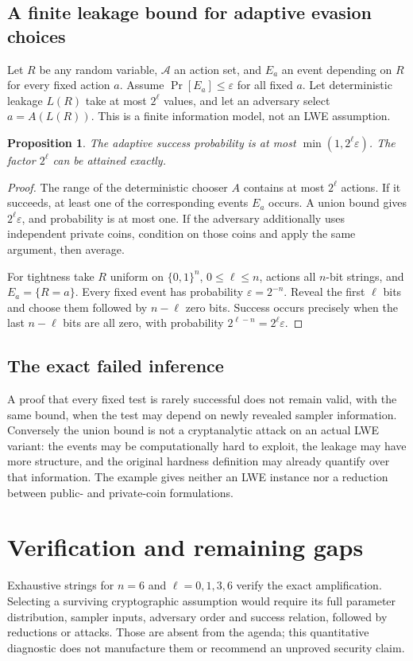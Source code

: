 \documentclass[11pt]{article}
\newtheorem{proposition}{Proposition}
\begin{document}
\subsection{A finite leakage bound for adaptive evasion choices}
Let $R$ be any random variable, $\mathcal A$ an action set, and $E_a$ an event depending on $R$ for every fixed action $a$. Assume $\Pr[E_a]\le\varepsilon$ for all fixed $a$. Let deterministic leakage $L(R)$ take at most $2^\ell$ values, and let an adversary select $a=A(L(R))$. This is a finite information model, not an LWE assumption.
\begin{proposition}
The adaptive success probability is at most $\min(1,2^\ell\varepsilon)$. The factor $2^\ell$ can be attained exactly.
\end{proposition}
\begin{proof}
The range of the deterministic chooser $A$ contains at most $2^\ell$ actions. If it succeeds, at least one of the corresponding events $E_a$ occurs. A union bound gives $2^\ell\varepsilon$, and probability is at most one. If the adversary additionally uses independent private coins, condition on those coins and apply the same argument, then average.

For tightness take $R$ uniform on $\{0,1\}^n$, $0\le\ell\le n$, actions all $n$-bit strings, and $E_a=\{R=a\}$. Every fixed event has probability $\varepsilon=2^{-n}$. Reveal the first $\ell$ bits and choose them followed by $n-\ell$ zero bits. Success occurs precisely when the last $n-\ell$ bits are all zero, with probability $2^{\ell-n}=2^\ell\varepsilon$.
\end{proof}
\subsection{The exact failed inference}
A proof that every fixed test is rarely successful does not remain valid, with the same bound, when the test may depend on newly revealed sampler information. Conversely the union bound is not a cryptanalytic attack on an actual LWE variant: the events may be computationally hard to exploit, the leakage may have more structure, and the original hardness definition may already quantify over that information. The example gives neither an LWE instance nor a reduction between public- and private-coin formulations.
\section{Verification and remaining gaps}
Exhaustive strings for $n=6$ and $\ell=0,1,3,6$ verify the exact amplification. Selecting a surviving cryptographic assumption would require its full parameter distribution, sampler inputs, adversary order and success relation, followed by reductions or attacks. Those are absent from the agenda; this quantitative diagnostic does not manufacture them or recommend an unproved security claim.
\end{document}
